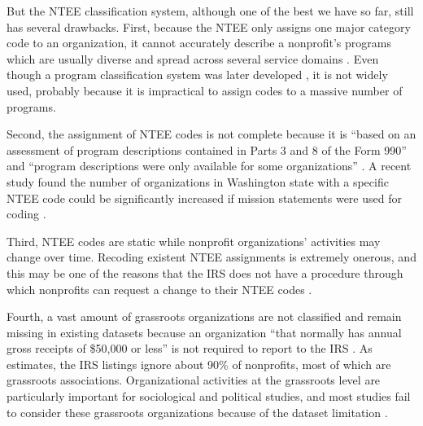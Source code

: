 \documentclass[11pt]{article}
\begin{document}
But the NTEE classification system, although one of the best we have so far, still has several drawbacks. First, because the NTEE only assigns one major category code to an organization, it cannot accurately describe a nonprofit's programs which are usually diverse and spread across several service domains \parencite[303]{GronbjergUsingNTEEclassify1994}. Even though a program classification system was later developed \parencite{LampkinIntroducingNonprofitProgram2001}, it is not widely used, probably because it is impractical to assign codes to a massive number of programs.

Second, the assignment of NTEE codes is not complete because it is ``based on an assessment of program descriptions contained in Parts 3 and 8 of the Form 990'' and ``program descriptions were only available for some organizations'' \parencite[16]{NationalCenterforCharitableStatisticsGuideUsingNCCS2006}. A recent study found the number of organizations in Washington state with a specific NTEE code could be significantly increased if mission statements were used for coding \parencite{FyallNTEECodesOpportunities2018}.

Third, NTEE codes are static while nonprofit organizations' activities may change over time. Recoding existent NTEE assignments is extremely onerous, and this may be one of the reasons that the IRS does not have a procedure through which nonprofits can request a change to their NTEE codes \parencite{USInternalRevenueServiceIRSStaticFiles2013}.

Fourth, a vast amount of grassroots organizations are not classified and remain missing in existing datasets because an organization ``that normally has annual gross receipts of \$50,000 or less'' is not required to report to the IRS \parencite{USInternalRevenueServiceAnnualExemptOrganization2019}. As \textcite{SmithRestNonprofitSector1997} estimates, the IRS listings ignore about 90\% of nonprofits, most of which are grassroots associations. Organizational activities at the grassroots level are particularly important for sociological and political studies, and most studies fail to consider these grassroots organizations because of the dataset limitation \parencite[e.g.,][]{McVeighStructuralInfluencesActivism2006,VasiNoFrackingWay2015,SharkeyCommunityCrimeDecline2017}.
\end{document}
